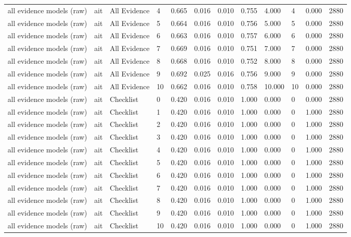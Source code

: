 \begin{table}[!ht]
{\begin{tabular}{llllllllllll}
all evidence models (raw) & ait & All Evidence & 4 & 0.665 & 0.016 & 0.010 & 0.755 & 4.000 & 4 & 0.000 & 2880 \\
all evidence models (raw) & ait & All Evidence & 5 & 0.664 & 0.016 & 0.010 & 0.756 & 5.000 & 5 & 0.000 & 2880 \\
all evidence models (raw) & ait & All Evidence & 6 & 0.663 & 0.016 & 0.010 & 0.757 & 6.000 & 6 & 0.000 & 2880 \\
all evidence models (raw) & ait & All Evidence & 7 & 0.669 & 0.016 & 0.010 & 0.751 & 7.000 & 7 & 0.000 & 2880 \\
all evidence models (raw) & ait & All Evidence & 8 & 0.668 & 0.016 & 0.010 & 0.752 & 8.000 & 8 & 0.000 & 2880 \\
all evidence models (raw) & ait & All Evidence & 9 & 0.692 & 0.025 & 0.016 & 0.756 & 9.000 & 9 & 0.000 & 2880 \\
all evidence models (raw) & ait & All Evidence & 10 & 0.662 & 0.016 & 0.010 & 0.758 & 10.000 & 10 & 0.000 & 2880 \\
all evidence models (raw) & ait & Checklist & 0 & 0.420 & 0.016 & 0.010 & 1.000 & 0.000 & 0 & 0.000 & 2880 \\
all evidence models (raw) & ait & Checklist & 1 & 0.420 & 0.016 & 0.010 & 1.000 & 0.000 & 0 & 1.000 & 2880 \\
all evidence models (raw) & ait & Checklist & 2 & 0.420 & 0.016 & 0.010 & 1.000 & 0.000 & 0 & 1.000 & 2880 \\
all evidence models (raw) & ait & Checklist & 3 & 0.420 & 0.016 & 0.010 & 1.000 & 0.000 & 0 & 1.000 & 2880 \\
all evidence models (raw) & ait & Checklist & 4 & 0.420 & 0.016 & 0.010 & 1.000 & 0.000 & 0 & 1.000 & 2880 \\
all evidence models (raw) & ait & Checklist & 5 & 0.420 & 0.016 & 0.010 & 1.000 & 0.000 & 0 & 1.000 & 2880 \\
all evidence models (raw) & ait & Checklist & 6 & 0.420 & 0.016 & 0.010 & 1.000 & 0.000 & 0 & 1.000 & 2880 \\
all evidence models (raw) & ait & Checklist & 7 & 0.420 & 0.016 & 0.010 & 1.000 & 0.000 & 0 & 1.000 & 2880 \\
all evidence models (raw) & ait & Checklist & 8 & 0.420 & 0.016 & 0.010 & 1.000 & 0.000 & 0 & 1.000 & 2880 \\
all evidence models (raw) & ait & Checklist & 9 & 0.420 & 0.016 & 0.010 & 1.000 & 0.000 & 0 & 1.000 & 2880 \\
all evidence models (raw) & ait & Checklist & 10 & 0.420 & 0.016 & 0.010 & 1.000 & 0.000 & 0 & 1.000 & 2880 \\

\end{tabular}}
\end{table}
